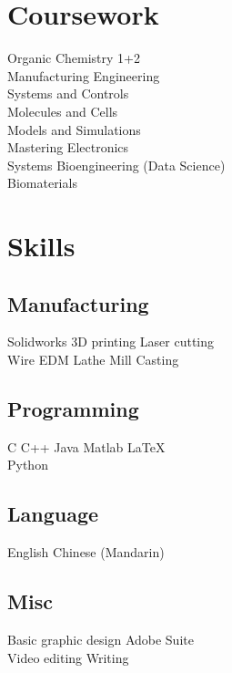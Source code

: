 \documentclass[]{deedy-resume}
\begin{document}
\begin{minipage}[t]{0.3\textwidth}

\section{Coursework}
Organic Chemistry 1+2\\
Manufacturing Engineering\\
Systems and Controls\\
Molecules and Cells\\
Models and Simulations\\
Mastering Electronics\\
Systems Bioengineering (Data Science)\\
Biomaterials\\



\section{Skills}
\subsection{Manufacturing}
Solidworks \textbullet{}   3D printing \textbullet{} Laser cutting \\
Wire EDM \textbullet{} Lathe \textbullet{} Mill \textbullet{} Casting \\
\sectionsep
\subsection{Programming}
C \textbullet{} C++ \textbullet{} Java \textbullet{} Matlab \textbullet \LaTeX \\
Python
\sectionsep
\subsection{Language}
English \textbullet{} Chinese (Mandarin)
\sectionsep
\subsection{Misc}
Basic graphic design \textbullet{} Adobe Suite\\
Video editing \textbullet{} Writing\\
\sectionsep

%
%

\end{minipage} 
\end{document}
